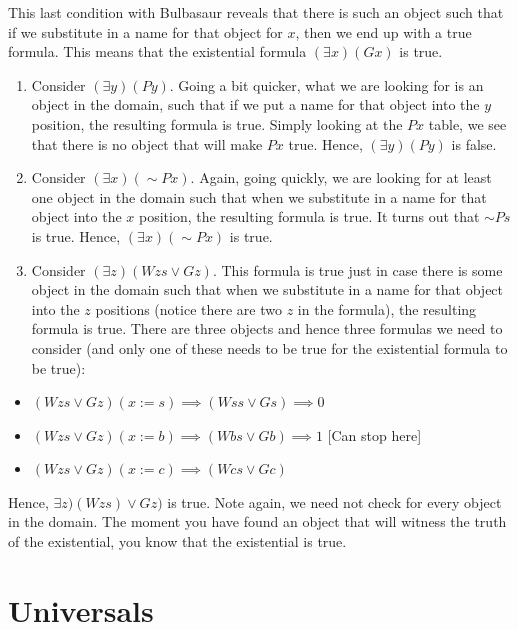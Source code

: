 \documentclass[
]{book}
\providecommand{\tightlist}{%
  \setlength{\itemsep}{0pt}\setlength{\parskip}{0pt}}
\begin{document}
This last condition with Bulbasaur reveals that there is such an object such that if we substitute in a name for that object for \(x\), then we end up with a true formula. This means that the existential formula \((\exists x)(Gx)\) is true.

\begin{enumerate}
\def\labelenumi{\arabic{enumi}.}
\setcounter{enumi}{1}
\item
  Consider \((\exists y)(Py)\). Going a bit quicker, what we are looking for is an object in the domain, such that if we put a name for that object into the \(y\) position, the resulting formula is true. Simply looking at the \(Px\) table, we see that there is no object that will make \(Px\) true. Hence, \((\exists y)(Py)\) is false.
\item
  Consider \((\exists x)(\sim Px)\). Again, going quickly, we are looking for at least one object in the domain such that when we substitute in a name for that object into the \(x\) position, the resulting formula is true. It turns out that \(\sim Ps\) is true. Hence, \((\exists x)(\sim Px)\) is true.
\item
  Consider \((\exists z)(Wzs \lor Gz)\). This formula is true just in case there is some object in the domain such that when we substitute in a name for that object into the \(z\) positions (notice there are two \(z\) in the formula), the resulting formula is true. There are three objects and hence three formulas we need to consider (and only one of these needs to be true for the existential formula to be true):
\end{enumerate}

\begin{itemize}
\tightlist
\item
  \((Wzs \lor Gz)(x:=s) \implies (Wss \lor Gs) \implies 0\)
\item
  \((Wzs \lor Gz)(x:=b) \implies(Wbs \lor Gb) \implies 1\) {[}Can stop here{]}
\item
  \((Wzs \lor Gz)(x:=c) \implies (Wcs \lor Gc)\)
\end{itemize}

Hence, \(\exists z)(Wzs)\lor Gz)\) is true. Note again, we need not check for every object in the domain. The moment you have found an object that will witness the truth of the existential, you know that the existential is true.

\hypertarget{universals}{%
\section{Universals}\label{universals}}
\end{document}
